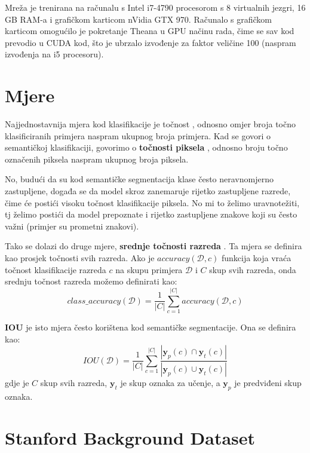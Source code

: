 \documentclass[times, utf8, diplomski, numeric]{fer}
\newcommand{\abs}[1]{\left\lvert#1\right\rvert}
\begin{document}
Mreža je trenirana na računalu s Intel i7-4790 procesorom s 8 virtualnih jezgri, 16 GB RAM-a i grafičkom karticom nVidia GTX 970. Računalo s grafičkom karticom omogućilo je pokretanje Theana u GPU načinu rada, čime se sav kod prevodio u CUDA kod, što je ubrzalo izvođenje za faktor veličine 100 (naspram izvođenja na i5 procesoru).

\section{Mjere}

Najjednostavnija mjera kod klasifikacije je točnost , odnosno omjer broja točno klasificiranih primjera naspram ukupnog broja primjera. Kad se govori o semantičkoj klasifikaciji, govorimo o \textbf{točnosti piksela} , odnosno broju točno označenih piksela naspram ukupnog broja piksela.

No, budući da su kod semantičke segmentacija klase često neravnomjerno zastupljene, događa se da model skroz zanemaruje rijetko zastupljene razrede, čime će postići visoku točnost klasifikacije piksela. No mi to želimo uravnotežiti, tj želimo postići da model prepoznate i rijetko zastupljene znakove koji su često važni (primjer su prometni znakovi).

Tako se dolazi do druge mjere, \textbf{srednje točnosti razreda} . Ta mjera se definira kao prosjek točnosti svih razreda. Ako je $accuracy(\mathcal{D}, c)$ funkcija koja vraća točnost klasifikacije razreda $c$ na skupu primjera $\mathcal{D}$ i $C$ skup svih razreda, onda srednju točnost razreda možemo definirati kao:
\begin{equation}
  class\_accuracy \left( \mathcal{D} \right) = \frac{1}{\abs{C}} \sum_{c=1}^{\abs{C}} accuracy(\mathcal{D}, c)
\end{equation}

\textbf{IOU} je isto mjera često korištena kod semantičke segmentacije. Ona se definira kao:
\begin{equation}
  IOU \left( \mathcal{D} \right) = \frac{1}{\abs{C}} \sum_{c=1}^{\abs{C}} \frac{\abs{\boldsymbol{y}_p(c) \cap \boldsymbol{y}_t(c)}}{\abs{\boldsymbol{y}_p(c) \cup \boldsymbol{y}_t(c)}}
\end{equation}
gdje je $C$ skup svih razreda, $\boldsymbol{y}_t$ je skup oznaka za učenje, a $\boldsymbol{y}_p$ je predviđeni skup oznaka.

\section{Stanford Background Dataset}
\end{document}
